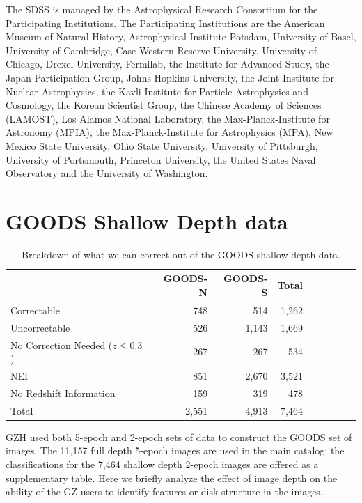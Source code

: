 \documentclass[usenatbib]{mn2e}
\begin{document}
The SDSS is managed by the Astrophysical Research Consortium for the Participating Institutions. The Participating Institutions are the American Museum of Natural History, Astrophysical  Institute Potsdam, University of Basel, University of Cambridge, Case Western Reserve University, University of Chicago, Drexel University, Fermilab, the Institute for Advanced Study, the Japan Participation Group, Johns Hopkins University, the Joint Institute for Nuclear Astrophysics, the Kavli Institute for Particle Astrophysics and Cosmology, the Korean Scientist Group, the Chinese Academy of Sciences (LAMOST), Los Alamos National Laboratory, the Max-Planck-Institute for Astronomy (MPIA), the Max-Planck-Institute for Astrophysics (MPA), New Mexico State University, Ohio State University, University of Pittsburgh, University of Portsmouth, Princeton University, the United States Naval Observatory and the University of Washington. 



\newpage
\clearpage
\appendix
\section{GOODS Shallow Depth data}


\begin{table}
\caption{Breakdown of what we can correct out of the GOODS shallow depth data. \label{tbl:goods_shallow_categories}}
\begin{tabular}{lrrrrrrrr}
\hline\hline
                                   & GOODS-N & GOODS-S & Total \\
\hline
Correctable                        & 748     & 514     & 1,262 \\
Uncorrectable                      & 526     & 1,143   & 1,669 \\
No Correction Needed ($z \le 0.3$) & 267     & 267     & 534   \\ 
NEI                                & 851     & 2,670   & 3,521 \\
No Redshift Information            & 159     & 319     & 478   \\
Total                              & 2,551   & 4,913   & 7,464 \\
\hline\hline
\end{tabular}
\end{table}



GZH used both 5-epoch and 2-epoch sets of data to construct the GOODS set of images. The 11,157 full depth 5-epoch images are used in the main catalog; the classifications for the 7,464 shallow depth 2-epoch images are offered as a supplementary table. Here we briefly analyze the effect of image depth on the ability of the GZ users to identify features or disk structure in the images. 
\end{document}
